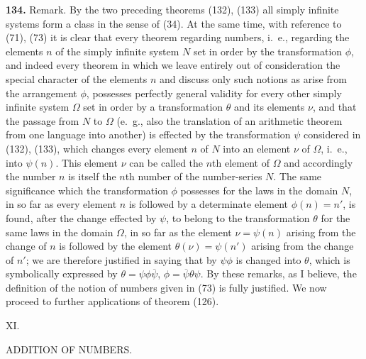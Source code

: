\documentclass[oneside]{book}
\makeatletter
\newcommand\mypara{\medskip\textbf}
\newcommand\mysect[3]{
\medskip\begin{center}{\large #2.}\end{center}
\begin{center}\uppercase{#3.}\end{center}
\addcontentsline{toc}{section}{\protect\phantom{#1}#2\@. #3}
}
\makeatother
\begin{document}
\mypara{134.} Remark. By the two preceding theorems
(132), (133) all simply infinite systems form a class in
the sense of (34). At the same time, with reference to
(71), (73) it is clear that every theorem regarding
numbers, i.~e., regarding the elements $n$ of the simply
infinite system $N$ set in order by the transformation $\phi$,
and indeed every theorem in which we leave entirely
out of consideration the special character of the elements
$n$ and discuss only such notions as arise from
the arrangement $\phi$, possesses perfectly general validity
for every other simply infinite system $\Omega$ set in order by
a transformation $\theta$ and its elements $\nu$, and that the
passage from $N$ to $\Omega$ (e.~g., also the translation of an
arithmetic theorem from one language into another)
is effected by the transformation $\psi$ considered in
(132), (133), which changes every element $n$ of $N$ into
an element $\nu$ of $\Omega$, i.~e., into $\psi(n)$. This element $\nu$
can be called the $n$th element of $\Omega$ and accordingly
the number $n$ is itself the $n$th number of the number-series
$N$. The same significance which the transformation
$\phi$ possesses for the laws in the domain $N$, in
so far as every element $n$ is followed by a determinate
element $\phi(n)=n'$, is found, after the change effected
by $\psi$, to belong to the transformation $\theta$ for the same
laws in the domain $\Omega$, in so far as the element $\nu=\psi(n)$
arising from the change of $n$ is followed by the element
$\theta(\nu)=\psi(n')$ arising from the change of $n'$; we
are therefore justified in saying that by $\psi \phi$ is changed
into $\theta$, which is symbolically expressed by $\theta=\psi\phi\overline{\psi}$,
$\phi=\overline{\psi}\theta\psi$. By these remarks, as I believe, the definition
of the notion of numbers given in (73) is fully
justified. We now proceed to further applications of
theorem (126).



\mysect{VII}{XI}{Addition of Numbers}
\end{document}
